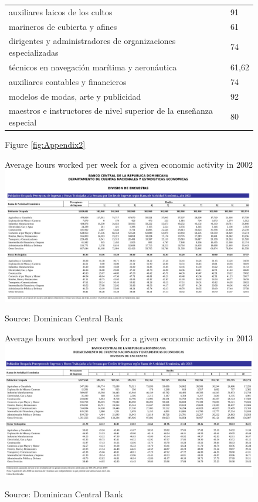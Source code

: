 \documentclass[12pt]{article}
\begin{document}
\begin{figure}[H]
\begin{center}
\begin{tabular}{ll}
auxiliares laicos de los cultos & 91\\
marineros de cubierta y afines & 61\\
dirigentes y administradores de organizaciones especializadas & 74\\
t\'{e}cnicos en navegaci\'{o}n mar\'{i}tima y aeron\'{a}utica & 61,62\\
auxiliares contables y financieros & 74\\
modelos de modas, arte y publicidad & 92\\
maestros e instructores de nivel superior de la ense\~{n}anza especial & 80
\end{tabular}

\normalsize
Figure \ref{fig:Appendix2}
\end{center}
\end{figure}

\begin{figure}[H]
\begin{center}
Average hours worked per week for a given economic activity in 2002
\includegraphics[scale=.7,keepaspectratio=true]{../Plots/AvgHoursOcc2002.pdf}
\caption{\label{fig:Appendix3}}
Source: Dominican Central Bank
\end{center}
\end{figure}

\begin{figure}[H]
\begin{center}
Average  hours worked per week for a given economic activity in 2013
\includegraphics[scale=.7,keepaspectratio=true]{../Plots/AvgHoursOcc2013.pdf}
\caption{\label{fig:Appendix4}}
Source: Dominican Central Bank
\end{center}
\end{figure}
\end{document}
